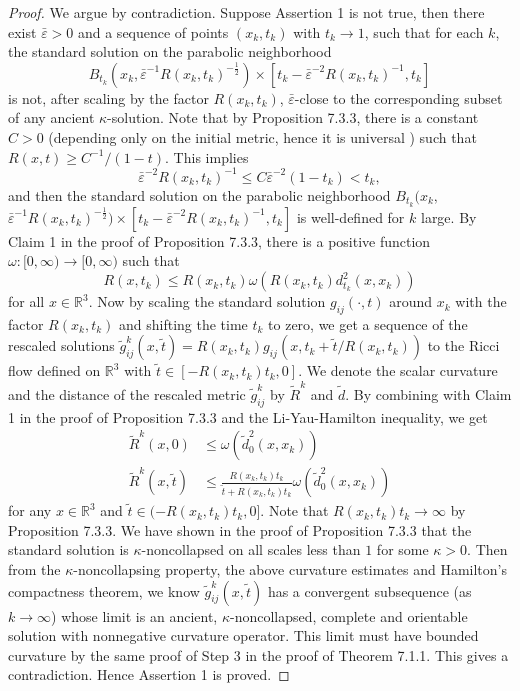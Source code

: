 \begin{proof}
We argue by contradiction. Suppose Assertion 1 is not true, then
there exist $\bar\varepsilon>0$ and a sequence of points
$(x_{k},t_k)$ with $t_{k}\rightarrow 1$, such that for each $k$,
the standard solution on the parabolic neighborhood
$$
B_{t_k}(x_k,\bar\varepsilon^{-1}R(x_k,t_k)^{-\frac{1}{2}}) \times
[t_k-\bar\varepsilon^{-2}R(x_k,t_k)^{-1},t_k]
$$
is not, after scaling by the factor $R(x_k,t_k)$,
$\bar\varepsilon$-close to the corresponding subset of any ancient
$\kappa$-solution. Note that by Proposition 7.3.3, there is a
constant $C>0$ (depending only on the initial metric, hence it is
universal ) such that $R(x,t)\geq C^{-1}/(1-t)$. This implies
$$
\bar\varepsilon^{-2}R(x_k,t_k)^{-1} \leq
C\bar\varepsilon^{-2}(1-t_k)<t_k ,
$$
and\; then\; the\; standard\; solution\; on\; the\; parabolic\;
neighborhood\; $B_{t_k}(x_k,$
$\bar\varepsilon^{-1}R(x_k,t_k)^{-\frac{1}{2}}) \times
[t_k-\bar\varepsilon^{-2}R(x_k,t_k)^{-1},t_k]$ is well-defined for
$k$ large. By Claim 1 in the proof of Proposition 7.3.3, there is
a positive function $\omega:[0,\infty)\rightarrow[0,\infty)$ such
that
$$
  R(x,t_k)\leq R(x_k,t_k)\omega(R(x_k,t_k)d_{t_k}^{2}(x,x_k))
$$
for all $x\in \mathbb{R}^3$.  Now by scaling the standard solution
$g_{ij}(\cdot,t)$ around $x_k$ with the factor $R(x_k,t_k)$ and
shifting the time $t_k$ to zero, we get a sequence of the rescaled
solutions $
\tilde{g}^{k}_{ij}(x,\tilde{t})=R(x_k,t_k)g_{ij}(x,t_k+\tilde{t}/R(x_k,t_k))$
to the Ricci flow defined on $\mathbb{R}^3$ with $\tilde{t}\in
[-R(x_k,t_k)t_k,0]$. We denote the scalar curvature and the
distance of the rescaled metric $\tilde{g}^{k}_{ij}$ by
$\tilde{R}^{k}$ and $\tilde{d}$. By combining with Claim 1 in the
proof of Proposition 7.3.3 and the Li-Yau-Hamilton inequality, we
get
\begin{align*}
\tilde{R}^{k}(x,0)& \leq \omega(\tilde{d}_{0}^{2}(x,x_k))\\
\tilde{R}^{k}(x,\tilde{t})& \leq
\frac{R(x_k,t_k)t_k}{\tilde{t}+R(x_k,t_k)t_k}
\omega(\tilde{d}_{0}^{2}(x,x_k))
\end{align*}
for any $x\in \mathbb{R}^3$ and $\tilde{t}\in (-R(x_k,t_k)t_k,0]$.
Note that $R(x_k,t_k)t_k\rightarrow \infty$ by Proposition 7.3.3.
We have shown in the proof of Proposition 7.3.3 that the standard
solution is $\kappa$-noncollapsed on all scales less than $1$ for
some $\kappa>0$. Then from the $\kappa$-noncollapsing property,
the above curvature estimates and Hamilton's compactness theorem,
we know $\tilde{g}^{k}_{ij}(x,\tilde{t})$ has a convergent
subsequence (as $k\rightarrow\infty$) whose limit is an ancient,
$\kappa$-noncollapsed, complete and orientable solution with
nonnegative curvature operator. This limit must have bounded
curvature by the same proof of Step 3 in the proof of Theorem
7.1.1. This gives a contradiction. Hence Assertion 1 is proved.
\end{proof}

